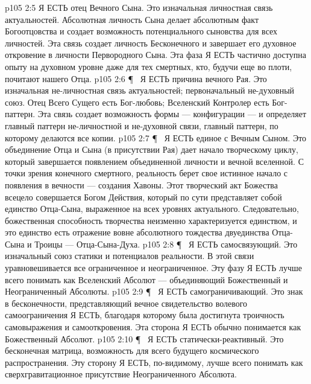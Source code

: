 \vs p105 2:5 \bibnobreakspace {} Я ЕСТЬ отец Вечного Сына. Это изначальная личностная связь актуальностей. Абсолютная личность Сына делает абсолютным факт Богоотцовства и создает возможность потенциального сыновства для всех личностей. Эта связь создает личность Бесконечного и завершает его духовное откровение в личности Первородного Сына. Эта фаза Я ЕСТЬ частично доступна опыту на духовном уровне даже для тех смертных, кто, будучи еще во плоти, почитают нашего Отца.
\vs p105 2:6 \P\ \bibnobreakspace {}  Я ЕСТЬ причина вечного Рая. Это изначальная не\hyp{}личностная связь актуальностей; первоначальный не\hyp{}духовный союз. Отец Всего Сущего есть Бог\hyp{}любовь; Вселенский Контролер есть Бог\hyp{}паттерн. Эта связь создает возможность формы --- конфигурации --- и определяет главный паттерн не\hyp{}личностной и не\hyp{}духовной связи, главный паттерн, по которому делаются все копии.
\vs p105 2:7 \P\ \bibnobreakspace {} Я ЕСТЬ единое с Вечным Сыном. Это объединение Отца и Сына (в присутствии Рая) дает начало творческому циклу, который завершается появлением объединенной личности и вечной вселенной. С точки зрения конечного смертного, реальность берет свое истинное начало с появления в вечности --- создания Хавоны. Этот творческий акт Божества всецело совершается Богом Действия, который по сути представляет собой единство Отца\hyp{}Сына, выраженное на всех уровнях актуального. Следовательно, божественная способность творчества неизменно характеризуется единством, и это единство есть отражение вовне абсолютного тождества двуединства Отца\hyp{}Сына и Троицы --- Отца\hyp{}Сына\hyp{}Духа.
\vs p105 2:8 \P\ \bibnobreakspace {} Я ЕСТЬ самосвязующий. Это изначальный союз статики и потенциалов реальности. В этой связи уравновешивается все ограниченное и неограниченное. Эту фазу Я ЕСТЬ лучше всего понимать как Вселенский Абсолют --- объединяющий Божественный и Неограниченный Абсолюты.
\vs p105 2:9 \P\ \bibnobreakspace {} Я ЕСТЬ самограничивающий. Это знак в бесконечности, представляющий вечное свидетельство волевого самоограничения Я ЕСТЬ, благодаря которому была достигнута троичность самовыражения и самооткровения. Эта сторона Я ЕСТЬ обычно понимается как Божественный Абсолют.
\vs p105 2:10 \P\ \bibnobreakspace {} Я ЕСТЬ статически\hyp{}реактивный. Это бесконечная матрица, возможность для всего будущего космического распространения. Эту сторону Я ЕСТЬ, по\hyp{}видимому, лучше всего понимать как сверхгравитационное присутствие Неограниченного Абсолюта.
